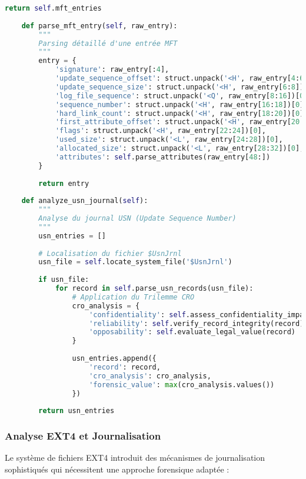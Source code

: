 \begin{lstlisting}[language=Python, caption=Analyseur NTFS avancé avec ZK-NR]
        return self.mft_entries
    
    def parse_mft_entry(self, raw_entry):
        """
        Parsing détaillé d'une entrée MFT
        """
        entry = {
            'signature': raw_entry[:4],
            'update_sequence_offset': struct.unpack('<H', raw_entry[4:6])[0],
            'update_sequence_size': struct.unpack('<H', raw_entry[6:8])[0],
            'log_file_sequence': struct.unpack('<Q', raw_entry[8:16])[0],
            'sequence_number': struct.unpack('<H', raw_entry[16:18])[0],
            'hard_link_count': struct.unpack('<H', raw_entry[18:20])[0],
            'first_attribute_offset': struct.unpack('<H', raw_entry[20:22])[0],
            'flags': struct.unpack('<H', raw_entry[22:24])[0],
            'used_size': struct.unpack('<L', raw_entry[24:28])[0],
            'allocated_size': struct.unpack('<L', raw_entry[28:32])[0],
            'attributes': self.parse_attributes(raw_entry[48:])
        }
        
        return entry
    
    def analyze_usn_journal(self):
        """
        Analyse du journal USN (Update Sequence Number)
        """
        usn_entries = []
        
        # Localisation du fichier $UsnJrnl
        usn_file = self.locate_system_file('$UsnJrnl')
        
        if usn_file:
            for record in self.parse_usn_records(usn_file):
                # Application du Trilemme CRO
                cro_analysis = {
                    'confidentiality': self.assess_confidentiality_impact(record),
                    'reliability': self.verify_record_integrity(record),
                    'opposability': self.evaluate_legal_value(record)
                }
                
                usn_entries.append({
                    'record': record,
                    'cro_analysis': cro_analysis,
                    'forensic_value': max(cro_analysis.values())
                })
        
        return usn_entries
\end{lstlisting}

\subsubsection{Analyse EXT4 et Journalisation}

Le système de fichiers EXT4 introduit des mécanismes de journalisation sophistiqués qui nécessitent une approche forensique adaptée :


